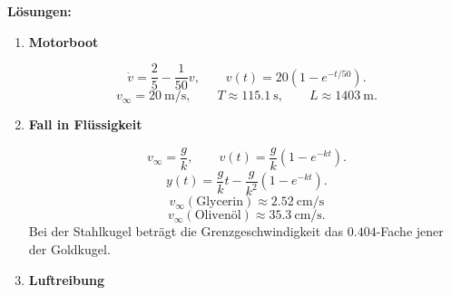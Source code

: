\clearpage
\textbf{Lösungen:}

\begin{enumerate}



    \item \textbf{Motorboot}

          \[
              \dot v=\frac25-\frac1{50}v,
              \qquad
              v(t)=20\left(1-e^{-t/50}\right).
          \]
          \[
              v_\infty=\SI{20}{\meter\per\second},
              \qquad
              T\approx\SI{115.1}{\second},
              \qquad
              L\approx\SI{1403}{\meter}.
          \]



    \item \textbf{Fall in Flüssigkeit}

          \[
              v_\infty=\frac gk,
              \qquad
              v(t)=\frac gk\left(1-e^{-kt}\right).
          \]
          \[
              y(t)=\frac gk t-\frac{g}{k^2}
              \left(1-e^{-kt}\right).
          \]
          \[
              v_\infty(\text{Glycerin})
              \approx\SI{2.52}{\centi\meter\per\second}
          \]
          \[
              v_\infty(\text{Olivenöl})
              \approx\SI{35.3}{\centi\meter\per\second}.
          \]
          Bei der Stahlkugel beträgt die Grenzgeschwindigkeit
          das \(0.404\)-Fache jener der Goldkugel.



    \item \textbf{Luftreibung}


\end{enumerate}
